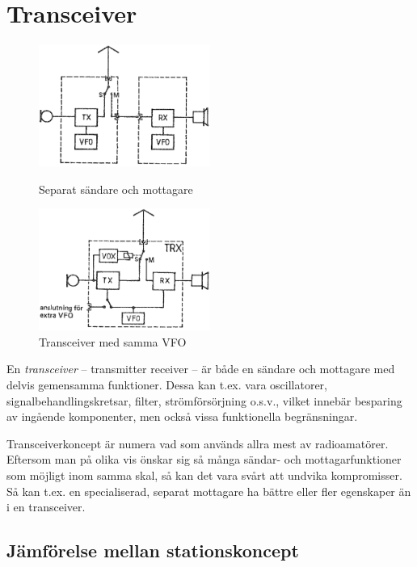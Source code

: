 \section{Transceiver}

\begin{figure}
  \includegraphics[width=0.5\textwidth]{images/cropped_pdfs/bild_2_5-09.pdf}
  \caption{Separat sändare och mottagare}
  \label{fig:bildII5-9}

  \includegraphics[width=0.5\textwidth]{images/cropped_pdfs/bild_2_5-10.pdf}
  \caption{Transceiver med samma VFO}
  \label{fig:bildII5-10}
\end{figure}

En \emph{transceiver} -- transmitter receiver -- är både en sändare och
mottagare med delvis gemensamma funktioner.
Dessa kan t.ex. vara oscillatorer, signalbehandlingskretsar, filter,
strömförsörjning o.s.v., vilket innebär besparing av ingående komponenter,
men också vissa funktionella begränsningar.

Transceiverkoncept är numera vad som används allra mest av radioamatörer.
Eftersom man på olika vis önskar sig så många sändar- och mottagarfunktioner
som möjligt inom samma skal, så kan det vara svårt att undvika kompromisser.
Så kan t.ex. en specialiserad, separat mottagare ha bättre eller fler
egenskaper än i en transceiver.

\subsection{Jämförelse mellan stationskoncept}

